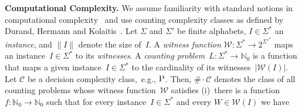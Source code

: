 \documentclass{article}
\newcommand{\Nat}{\mathbb{N}} %
\newcommand{\CCard}[1]{\|#1\|}
\newcommand{\Card}[1]{\left|#1\right|}
\renewcommand{\P}{\ensuremath{\textsc{P}}\xspace}
\newcommand{\WWW}{\ensuremath{\mathcal{W}}}%
\newcommand{\mtext}[1]{\ensuremath{\mathcal{#1}}}
\newcommand{\cnt}[0]{\ensuremath{\#}}
\newcommand{\cntc}[0]{\ensuremath{\cnt\cdot}}
\begin{document}
\smallskip\noindent\textbf{Computational Complexity.}
%
%
We assume familiarity with standard notions in
  computational complexity~\cite{Papadimitriou94} and use counting complexity classes
  as defined by Durand, Hermann and
  Kolaitis~\cite{DurandHermannKolaitis05}.
%
%
%
%
%
%
%
%
Let $\Sigma$ and $\Sigma'$ be finite alphabets, $I \in \Sigma^*$ an \emph{instance}, and $\CCard{I}$
 denote the size of~$I$. %
%
%
%
%
A \emph{witness function} %
 $\mathcal{W}: \Sigma^* \rightarrow 2^{{\Sigma'}^*}$ %
maps an instance~$I \in \Sigma^*$ to its \emph{witnesses}. 
A
\emph{counting
  problem}~$L: \Sigma^* \rightarrow \Nat_0$ is a
function that maps a given instance~$I \in \Sigma^*$ to the cardinality of its
witnesses~$\Card{\WWW(I)}$.
%
%
Let $\mtext{C}$ be a decision complexity class,~e.g., \P. Then,
$\cntc\mtext{C}$ denotes the class of all counting problems whose
witness function~$\WWW$ satisfies (i)~there is a
function~$f: \Nat_0 \rightarrow \Nat_0$ such that for every
instance~$I \in \Sigma^*$ and every $W \in \WWW(I)$ we have
\end{document}
